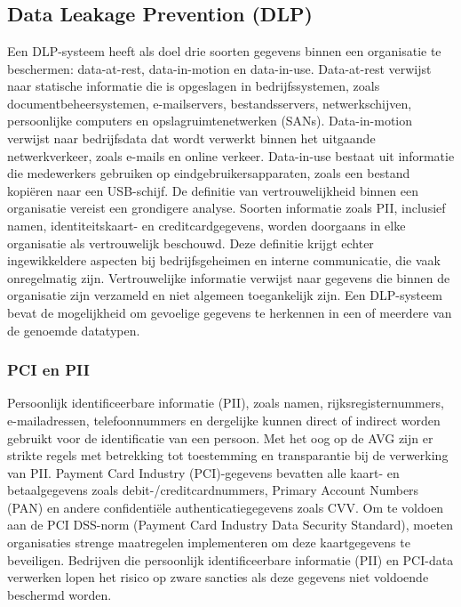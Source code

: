\chapter{}%
\label{ch:stand-van-zaken}




\section{Data Leakage Prevention (DLP)}%

Een DLP-systeem heeft als doel drie soorten gegevens binnen een organisatie te beschermen: data-at-rest, data-in-motion en data-in-use. 
Data-at-rest verwijst naar statische informatie die is opgeslagen in bedrijfssystemen, zoals documentbeheersystemen, e-mailservers, bestandsservers, netwerkschijven, 
persoonlijke computers en opslagruimtenetwerken (SANs). 
Data-in-motion verwijst naar bedrijfsdata dat wordt verwerkt binnen het uitgaande netwerkverkeer, zoals e-mails en online verkeer. 
Data-in-use bestaat uit informatie die medewerkers gebruiken op eindgebruikersapparaten, zoals een bestand kopiëren naar een USB-schijf. 
De definitie van vertrouwelijkheid binnen een organisatie vereist een grondigere analyse. 
Soorten informatie zoals PII, inclusief namen, identiteitskaart- en creditcardgegevens, worden doorgaans in elke organisatie als vertrouwelijk beschouwd.
Deze definitie krijgt echter ingewikkeldere aspecten bij bedrijfsgeheimen en interne communicatie, die vaak onregelmatig zijn. 
Vertrouwelijke informatie verwijst naar gegevens die binnen de organisatie zijn verzameld en niet algemeen toegankelijk zijn. 
Een DLP-systeem bevat de mogelijkheid om gevoelige gegevens te herkennen in een of meerdere van de genoemde datatypen.

\subsection{PCI en PII}

Persoonlijk identificeerbare informatie (PII), zoals namen, rijksregisternummers, e-mail\-adressen, telefoonnummers en dergelijke kunnen direct of indirect worden gebruikt voor de identificatie van een persoon. 
Met het oog op de AVG zijn er strikte regels met betrekking tot toestemming en transparantie bij de verwerking van PII. 
Payment Card Industry (PCI)-gegevens bevatten alle kaart- en betaalgegevens zoals debit-/creditcardnummers, Primary Account Numbers (PAN) en andere confidentiële authenticatiegegevens zoals CVV. 
Om te voldoen aan de PCI DSS-norm (Payment Card Industry Data Security Standard), 
moeten organisaties strenge maatregelen implementeren om deze kaartgegevens te beveiligen. 
Bedrijven die persoonlijk identificeerbare informatie (PII) en PCI-data verwerken lopen het risico op zware sancties als deze gegevens niet voldoende beschermd worden.

